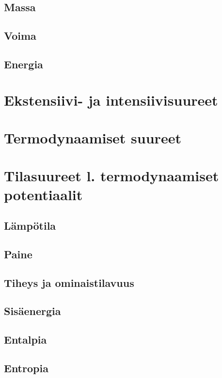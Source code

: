 \documentclass[12pt,a4paper,finnish]{book}
\begin{document}
\subsection{Massa}

\subsection{Voima}

\subsection{Energia}

\section{Ekstensiivi- ja intensiivisuureet}

\section{Termodynaamiset suureet}

\section{Tilasuureet l. termodynaamiset potentiaalit} 

\subsection{Lämpötila}

\subsection{Paine}

\subsection{Tiheys ja ominaistilavuus}

\subsection{Sisäenergia}

\subsection{Entalpia}

\subsection{Entropia}
\end{document}
